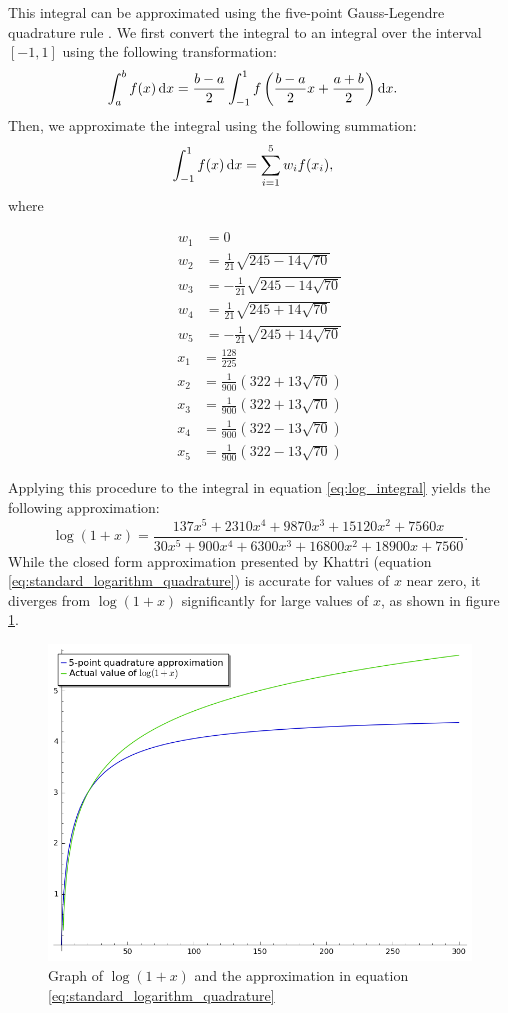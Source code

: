 This integral can be approximated using the five-point Gauss-Legendre quadrature rule \cite{kythe_quadrature_2002}. We first convert the integral to an integral over the interval $[-1,1]$ using the following transformation:
\begin{align*}
	\int_a^b{f(x)\mathop{}\!\mathrm{d} x}
	&= \frac{b-a}{2}\int_{-1}^{1}{f\left(\frac{b-a}{2}x+\frac{a+b}{2}\right)\mathop{}\!\mathrm{d} x}.
\end{align*}
Then, we approximate the integral using the following summation:
\begin{align*}
	\int_{-1}^{1}{f(x)\mathop{}\!\mathrm{d} x} &= \sum_{i=1}^{5}{w_if(x_i)},
\end{align*}
where
\begin{multicols}{2}
	\noindent
	\begin{align*}
		w_1 &= 0\\
		w_2 &= \frac{1}{21}\sqrt{245-14\sqrt{70}}\\
		w_3 &= -\frac{1}{21}\sqrt{245-14\sqrt{70}}\\
		w_4 &= \frac{1}{21}\sqrt{245+14\sqrt{70}}\\
		w_5 &= -\frac{1}{21}\sqrt{245+14\sqrt{70}}
	\end{align*}
	\columnbreak
	\begin{align*}
		x_1 &= \frac{128}{225}\\
		x_2 &= \frac{1}{900}\left( 322 + 13\sqrt{70}\right)\\
		x_3 &= \frac{1}{900}\left( 322 + 13\sqrt{70}\right)\\
		x_4 &= \frac{1}{900}\left( 322 - 13\sqrt{70}\right)\\
		x_5 &= \frac{1}{900}\left( 322 - 13\sqrt{70}\right)
	\end{align*}
\end{multicols}
Applying this procedure to the integral in equation \ref{eq:log_integral} yields the following approximation:
\begin{equation}\label{eq:standard_logarithm_quadrature}
	\log(1+x) =
	\frac{137x^5 + 2310x^4 + 9870x^3 + 15120x^2 + 7560x}
	{30x^5 + 900x^4 + 6300x^3 + 16800x^2 + 18900x + 7560}.
\end{equation}
While the closed form approximation presented by Khattri (equation \ref{eq:standard_logarithm_quadrature}) is accurate for values of $x$ near zero, it diverges from $\log{(1+x)}$ significantly for large values of $x$, as shown in figure \ref{fig:standard_logarithm_quadrature}.
\begin{figure}[!ht]
		\centering
		\includegraphics[width=.8\linewidth]{figures/StandardQuadrature.png}
		\caption{Graph of $\log{(1+x)}$ and the approximation in equation \ref{eq:standard_logarithm_quadrature}}
		\label{fig:standard_logarithm_quadrature}
\end{figure}
